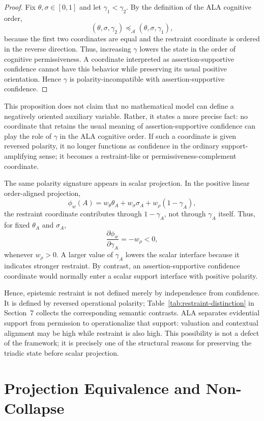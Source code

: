 \documentclass[reqno,final]{amsart}
\theoremstyle{definition}
\theoremstyle{plain}
\theoremstyle{remark}
\providecommand{\preceqA}{\preceq_{\mathcal A}}
\begin{document}
\begin{proof}
Fix \(\theta,\sigma\in[0,1]\) and let \(\gamma_1<\gamma_2\). By the definition of the ALA cognitive order,
\[
(\theta,\sigma,\gamma_2)\preceqA(\theta,\sigma,\gamma_1),
\]
because the first two coordinates are equal and the restraint coordinate is ordered in the reverse direction. Thus, increasing \(\gamma\) lowers the state in the order of cognitive permissiveness. A coordinate interpreted as assertion-supportive confidence cannot have this behavior while preserving its usual positive orientation. Hence \(\gamma\) is polarity-incompatible with assertion-supportive confidence.
\end{proof}

This proposition does not claim that no mathematical model can define a negatively oriented auxiliary variable. Rather, it states a more precise fact: no coordinate that retains the usual meaning of assertion-supportive confidence can play the role of \(\gamma\) in the ALA cognitive order. If such a coordinate is given reversed polarity, it no longer functions as confidence in the ordinary support-amplifying sense; it becomes a restraint-like or permissiveness-complement coordinate.

The same polarity signature appears in scalar projection. In the positive linear order-aligned projection,
\[
\phi_w(A)
=
w_\theta\theta_A+w_\sigma\sigma_A+w_\rho(1-\gamma_A),
\]
the restraint coordinate contributes through \(1-\gamma_A\), not through \(\gamma_A\) itself. Thus, for fixed \(\theta_A\) and \(\sigma_A\),
\[
\frac{\partial \phi_w}{\partial \gamma_A}=-w_\rho<0,
\]
whenever \(w_\rho>0\). A larger value of \(\gamma_A\) lowers the scalar interface because it indicates stronger restraint. By contrast, an assertion-supportive confidence coordinate would normally enter a scalar support interface with positive polarity.

Hence, epistemic restraint is not defined merely by independence from confidence. It is defined by reversed operational polarity; Table~\ref{tab:restraint-distinction} in Section~7 collects the corresponding semantic contrasts. ALA separates evidential support from permission to operationalize that support: valuation and contextual alignment may be high while restraint is also high. This possibility is not a defect of the framework; it is precisely one of the structural reasons for preserving the triadic state before scalar projection.

\section{Projection Equivalence and Non-Collapse}
\label{sec:projection-equivalence}
\end{document}
